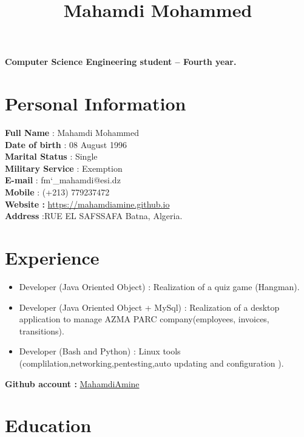 \documentclass[12pt,a4paper,sans]{moderncv}
\title{Mahamdi Mohammed }
\begin{document}
	\makecvtitle
	\textbf{Computer Science Engineering student  – Fourth year.}
	\section{ Personal Information}
	\vspace{3ex}
	\textbf{Full Name}	        : Mahamdi Mohammed\\
	\textbf{Date of birth }		: 08 August 1996\\
	\textbf{Marital Status}		: Single\\
	\textbf{Military Service}	: Exemption\\
	\textbf{E-mail}				: fm\char`_mahamdi@esi.dz\\
	\textbf{Mobile}		: (+213) 779237472\\
	\textbf{Website :}  \href{https://mahamdiamine.github.io}
						{https://mahamdiamine.github.io}\\
	\textbf{Address}			:RUE EL SAFSSAFA Batna, Algeria. 
	
	\section{Experience}
	\vspace{3ex}
	\begin{itemize}
		
		\item{Developer (Java Oriented Object) : Realization of a quiz game (Hangman).}
		\vspace{1ex}
		\item{Developer (Java Oriented Object + MySql) : Realization of a desktop application to manage AZMA PARC company(employees, invoices, transitions).}
		\vspace{1ex}
		\item{Developer (Bash and Python)   : Linux tools (complilation,networking,pentesting,auto updating and configuration ). }
		\vspace{1ex}
	\end{itemize}
	
	\textbf{Github account :}  \href{https://github.com/MahamdiAmine}{MahamdiAmine}
	
	\section{Education}
	
\end{document}

